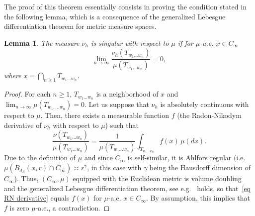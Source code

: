 \documentclass[11pt]{amsart}
\newtheorem{lemma}[theorem]{Lemma}
\theoremstyle{definition}
\theoremstyle{remark}
\theoremstyle{example}
\numberwithin{equation}{section}
\begin{document}
The proof of this theorem essentially consists in proving the condition stated in the following lemma, which is a consequence of the generalized Lebesgue differentiation theorem for metric measure spaces.
\begin{lemma}\label{prop Leb diff thm}
The measure $\nu_h$ is singular with respect to $\mu$ if for $\mu$-a.e. $x\in C_\infty$
\[
\lim_{n\to\infty}\frac{\nu_h(T_{w_1\ldots w_n})}{\mu(T_{w_1\ldots w_n})}=0,
\]
where $x=\bigcap_{n\geq 1}T_{w_1\ldots w_n}$.
\end{lemma}
\begin{proof}
For each $n\geq 1$, $T_{w_1\ldots w_n}$ is a neighborhood of $x$ and $\lim_{n\to\infty}\mu(T_{w_1,\ldots w_n})=0$. Let us suppose that $\nu_h$ is absolutely continuous with respect to $\mu$. Then, there exists a measurable function $f$ (the Radon-Nikodym derivative of $\nu_h$ with respect to $\mu$) such that
\begin{equation}\label{eq RN derivative}
\frac{\nu(T_{w_1\ldots w_n})}{\mu(T_{w_1\ldots w_n})}
=\frac{1}{\mu(T_{w_1\ldots w_n})}\int_{T_{w_1\ldots w_n}}f(x)\,\mu(dx).
\end{equation}
Due to the definition of $\mu$ and since $C_\infty$ is self-similar, it is Ahlfors regular (i.e. $\mu(B_{d_E}(x,r)\cap C_\infty)\asymp r^{\gamma}$, in this case with $\gamma$ being the Hausdorff dimension of $C_\infty$). Thus, $(C_\infty,\mu)$ equipped with the Euclidean metric is volume doubling 
and the generalized Lebesgue differentiation theorem, see e.g.~\cite[Theorem 1.8]{Hei01} holds, so that~\eqref{eq RN derivative} equals $f(x)$ for $\mu$-a.e. $x\in C_\infty$. By assumption, this implies that $f$ is zero $\mu$-a.e., a contradiction.
\end{proof}
\end{document}
